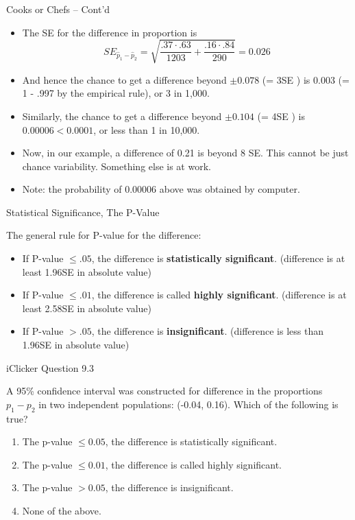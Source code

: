 \documentclass[14pt]{beamer}\usepackage[]{graphicx}\usepackage[]{color}
\begin{document}
\begin{frame}[fragile]{Cooks or Chefs -- Cont'd}

{\small{
\begin{itemize}
\item The SE for the difference in proportion is
$$ SE_{\hat{p}_1 - \hat{p}_2} = \sqrt{ \frac{ .37 \cdot .63}{1203} + \frac{ .16 \cdot .84}{290} } = 0.026 $$ 
\item And hence the chance to get a difference beyond $\pm 0.078$ (= 3SE ) is 0.003  (= 1 - .997 by the empirical rule), or 3 in 1,000.
\item Similarly, the chance to get a difference beyond $\pm 0.104$ (= 4SE ) is $0.00006 < 0.0001$, or less than 1 in 10,000.
\item Now, in our example, a difference of 0.21 is beyond 8 SE. This cannot be  just chance variability.  Something else is at work.
\item Note: the probability of 0.00006 above was obtained by computer.
\end{itemize}
}}
\end{frame}

\begin{frame}[fragile]{Statistical Significance, The P-Value}

The general rule for P-value for the difference:

\begin{itemize}
\item If P-value $\le .05$, the difference is \textbf{statistically significant}.  (difference is at least 1.96SE in absolute value)
\item If P-value $\le .01$, the difference is called \textbf{highly significant}.  (difference is at least 2.58SE in absolute value)
\item If P-value $> .05$, the difference is \textbf{insignificant}. (difference is less  than 1.96SE in absolute value)
\end{itemize}
\end{frame}

\begin{frame}[fragile]{iClicker Question 9.3}

A 95\% confidence interval was constructed for difference in the proportions $p_1 - p_2$ in two independent populations: (-0.04, 0.16). Which of the following is true?

\begin{enumerate}
\item The p-value $\le 0.05$, the difference is statistically significant.
\item The p-value $\le 0.01$, the difference is called highly significant.
\item The p-value $> 0.05$, the difference is insignificant.
\item None of the above.
\end{enumerate}
\end{frame}
\end{document}
